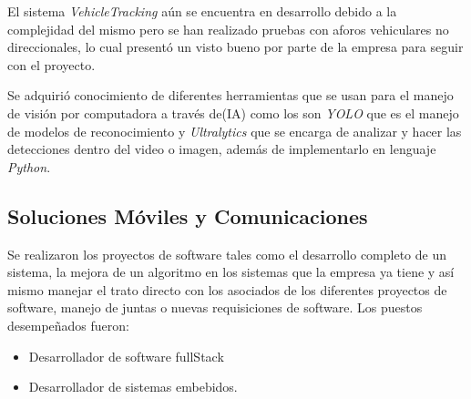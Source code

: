 \documentclass[protocolo.tex]{subfiles}
\begin{document}
\begin{enumerate}
El sistema \textit{VehicleTracking} aún se encuentra en desarrollo debido a la complejidad del mismo pero se han realizado pruebas con aforos vehiculares no direccionales, lo cual presentó un visto bueno por parte de la empresa para seguir con el proyecto.


Se adquirió conocimiento de diferentes herramientas que se usan para el manejo de visión por computadora a través de(IA) como los son \textit{YOLO} que es el manejo de modelos de reconocimiento y \textit{Ultralytics} que se encarga de analizar y hacer las detecciones dentro del video o imagen, además de implementarlo en lenguaje \textit{Python}.\vspace{5mm} 
\end{enumerate}




\subsection{Soluciones Móviles y Comunicaciones}

Se realizaron los proyectos de software tales como el desarrollo completo de un
sistema, la mejora de un algoritmo en los sistemas que la empresa ya tiene y así mismo
manejar el trato directo con los asociados de los diferentes proyectos de software, 
manejo de juntas o nuevas requisiciones de software.
Los puestos desempeñados fueron:

\begin{itemize}
\item Desarrollador de software fullStack
\item Desarrollador de sistemas embebidos.
\end{itemize}
\end{document}
